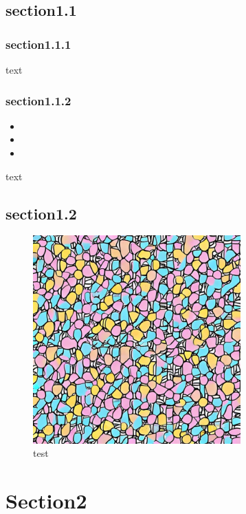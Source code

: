 \documentclass[14pt,A4]{extarticle}
\begin{document}
\subsection{section1.1}

\subsubsection{section1.1.1}

text

\subsubsection{section1.1.2}

\begin{itemize}
 \item
 \item
 \item
\end{itemize}

\vspace{10mm}

text



\subsection{section1.2}

\begin{figure}[H]
 \centering
 \includegraphics[height=8cm]{img/test1}
 \caption{test}
 \label{fig:image}
\end{figure}



\newpage

\section{Section2}
\end{document}
